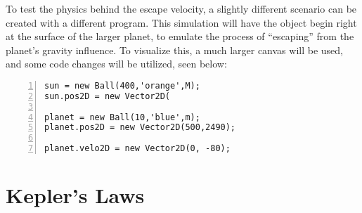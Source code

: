 To test the physics behind the escape velocity, a slightly different scenario can be created with a different program.  This simulation will have the object begin right at the surface of the larger planet, to emulate the process of ``escaping'' from the planet's gravity influence.  To visualize this, a much larger canvas will be used, and some code changes will be utilized, seen below:


\begin{lstlisting}[breaklines=true, frame=single, numbers=left, caption=Various tools functions used for orbit simulation, label=lst:basicorbittools]
sun = new Ball(400,'orange',M);
sun.pos2D = new Vector2D(

planet = new Ball(10,'blue',m);
planet.pos2D = new Vector2D(500,2490);

planet.velo2D = new Vector2D(0, -80);
\end{lstlisting}















\section{Kepler's Laws}






























